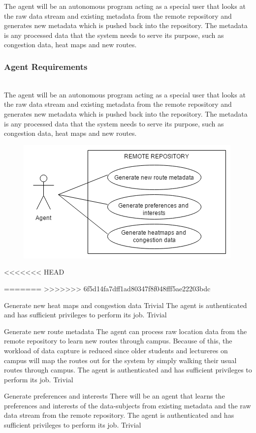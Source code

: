 The agent will be an autonomous program acting as a special user that looks at the raw data stream and existing metadata from the remote repository and generates new metadata which is pushed back into the repository. The metadata is any processed data that the system needs to serve its purpose, such as congestion data, heat maps and new routes.

\subsubsection{Agent Requirements}\mbox{}\\
The agent will be an autonomous program acting as a special user that looks at the raw data stream and existing metadata from the remote repository and generates new metadata which is pushed back into the repository. The metadata is any processed data that the system needs to serve its purpose, such as congestion data, heat maps and new routes.
\begin{figure}[h] 
  \includegraphics[width=\textwidth]{diagrams/Specific_Requirements/Agent_Use_Case.png}
\end{figure}
<<<<<<< HEAD

=======
>>>>>>> 6f5d14fa7dff1ad80347f8f048fff5ae22203bdc
\\
\bigskip

\FuncReq
{Generate new heat maps and congestion data}
{Trivial}
{The agent is authenticated and has sufficient privileges to perform its job.}
{Trivial}

\FuncReq
{Generate new route metadata}
{The agent can process raw location data from the remote repository to learn new routes through campus. Because of this, the workload of data capture is reduced since older students and lectureres on campus will map the routes out for the system by simply walking their usual routes through campus.}
{The agent is authenticated and has sufficient privileges to perform its job.}
{Trivial}

\FuncReq
{Generate preferences and interests}
{There will be an agent that learns the preferences and interests of the data-subjects from existing metadata and the raw data stream from the remote repository.}
{The agent is authenticated and has sufficient privileges to perform its job.}
{Trivial}
 
